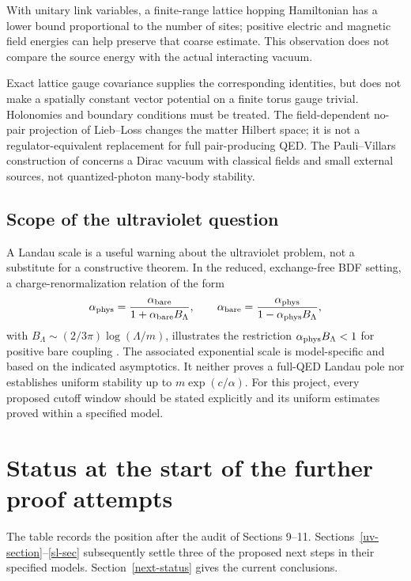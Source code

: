 With unitary link variables, a finite-range lattice hopping Hamiltonian
has a lower bound proportional to the number of sites; positive electric
and magnetic field energies can help preserve that coarse estimate.
This observation does not compare the source energy with the actual
interacting vacuum.

Exact lattice gauge covariance supplies the corresponding identities,
but does not make a spatially constant vector potential on a finite
torus gauge trivial. Holonomies and boundary conditions must be treated.
The field-dependent no-pair projection of Lieb--Loss \cite{LL2002}
changes the matter Hilbert space; it is not a regulator-equivalent
replacement for full pair-producing QED. The Pauli--Villars construction
of \cite{GHLS2013} concerns a Dirac vacuum with classical fields and small
external sources, not quantized-photon many-body stability.

\subsection{Scope of the ultraviolet question}
A Landau scale is a useful warning about the ultraviolet problem,
not a substitute for a constructive theorem. In the reduced, exchange-free
BDF setting, a charge-renormalization relation of the form
\begin{equation}
\alpha_{\rm phys}
=\frac{\alpha_{\rm bare}}{1+\alpha_{\rm bare} B_\Lambda},
\qquad
\alpha_{\rm bare}
=\frac{\alpha_{\rm phys}}{1-\alpha_{\rm phys}B_\Lambda},
\end{equation}
with \(B_\Lambda\sim(2/3\pi)\log(\Lambda/m)\), illustrates the restriction
\(\alpha_{\rm phys}B_\Lambda<1\) for positive bare coupling
\cite{HLS2005,GLS2009}. The associated exponential scale is model-specific and
based on the indicated asymptotics. It neither proves a full-QED Landau
pole nor establishes uniform stability up to \(m\exp(c/\alpha)\).
For this project, every proposed cutoff window should be stated explicitly
and its uniform estimates proved within a specified model.

\section{Status at the start of the further proof attempts}
\label{sec:status}

The table records the position after the audit of Sections 9--11.
Sections~\ref{uv-section}--\ref{sl-sec} subsequently settle three of
the proposed next steps in their specified models.
Section~\ref{next-status} gives the current conclusions.

